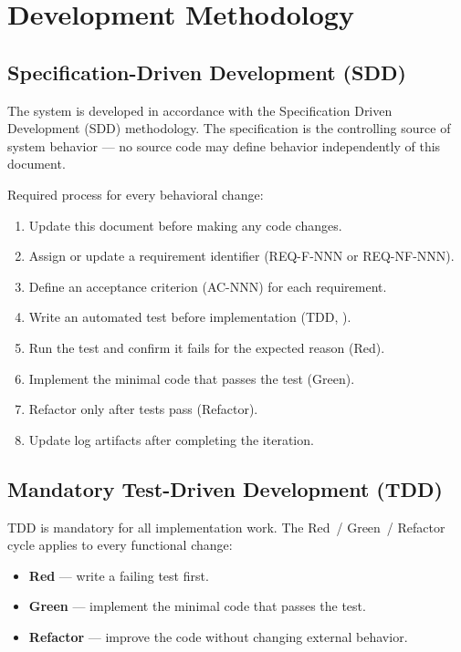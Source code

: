 \section{Development Methodology}
\label{sec:metodolohiia}

\subsection{Specification-Driven Development (SDD)}

The system is developed in accordance with the Specification Driven Development (SDD) methodology. The specification is the controlling source of system behavior --- no source code may define behavior independently of this document. 

Required process for every behavioral change:

\begin{enumerate}
  \item Update this document before making any code changes.
  \item Assign or update a requirement identifier (REQ-F-NNN or REQ-NF-NNN).
  \item Define an acceptance criterion (AC-NNN) for each requirement.
  \item Write an automated test before implementation (TDD, ).
  \item Run the test and confirm it fails for the expected reason (Red).
  \item Implement the minimal code that passes the test (Green).
  \item Refactor only after tests pass (Refactor).
  \item Update log artifacts after completing the iteration.
\end{enumerate}

\subsection{Mandatory Test-Driven Development (TDD)}

TDD is mandatory for all implementation work. The Red~/ Green~/ Refactor cycle applies to every functional change: 

\begin{itemize}
  \item \textbf{Red} --- write a failing test first.
  \item \textbf{Green} --- implement the minimal code that passes the test.
  \item \textbf{Refactor} --- improve the code without changing external behavior.
\end{itemize}

